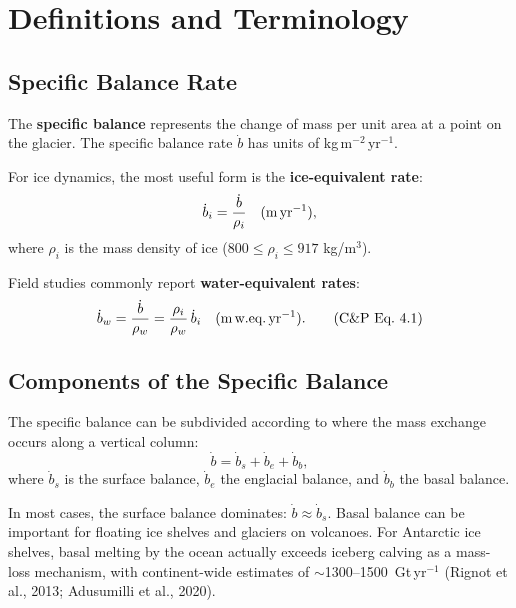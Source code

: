 \documentclass[11pt]{article}
\begin{document}
\section{Definitions and Terminology}

\subsection{Specific Balance Rate}

The \textbf{specific balance} represents the change of mass per unit area at a point on the glacier.  The specific balance rate $\dot{b}$ has units of kg\,m$^{-2}$\,yr$^{-1}$.

For ice dynamics, the most useful form is the \textbf{ice-equivalent rate}:
\begin{equation}
  \dot{b}_i = \frac{\dot{b}}{\rho_i} \quad (\text{m\,yr}^{-1}),
\end{equation}
where $\rho_i$ is the mass density of ice ($800\le\rho_i\le917$ kg/m$^3$).

Field studies commonly report \textbf{water-equivalent rates}:
\begin{equation}
  \dot{b}_w = \frac{\dot{b}}{\rho_w} = \frac{\rho_i}{\rho_w}\,\dot{b}_i \quad (\text{m\,w.eq.\,yr}^{-1}).
  \tag{C\&P Eq.~4.1}
\end{equation}

\subsection{Components of the Specific Balance}

The specific balance can be subdivided according to where the mass exchange occurs along a vertical column:
\begin{equation}
  \dot{b} = \dot{b}_s + \dot{b}_e + \dot{b}_b,
\end{equation}
where $\dot{b}_s$ is the surface balance, $\dot{b}_e$ the englacial balance, and $\dot{b}_b$ the basal balance.

In most cases, the surface balance dominates: $\dot{b} \approx \dot{b}_s$.  Basal balance can be important for floating ice shelves and glaciers on volcanoes.  For Antarctic ice shelves, basal melting by the ocean actually exceeds iceberg calving as a mass-loss mechanism, with continent-wide estimates of $\sim$1300--1500~Gt\,yr$^{-1}$ (Rignot et al., 2013; Adusumilli et al., 2020).
\end{document}
